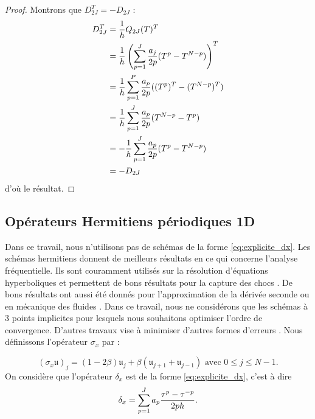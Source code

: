 \begin{proof}
Montrons que $D_{2J}^T = - D_{2J}$ :
\begin{align*}
D_{2J}^T & = \dfrac{1}{h} Q_{2J}(T)^T \\
	& = \dfrac{1}{h} \left( \displaystyle\sum\limits_{p=1}^J \dfrac{a_j}{2p} (T^p - T^{N-p}) \right)^T\\
	& = \dfrac{1}{h}\displaystyle\sum\limits_{p=1}^P \dfrac{a_p}{2p} ((T^p)^T - (T^{N-p})^T) \\
	& = \dfrac{1}{h}\displaystyle\sum\limits_{p=1}^J \dfrac{a_p}{2p} (T^{N-p} - T^{p}) \\
	& = - \dfrac{1}{h} \displaystyle\sum\limits_{p=1}^J \dfrac{a_p}{2p} (T^p - T^{N-p}) \\
	& = - D_{2J}
\end{align*}
d'où le résultat.
\end{proof}





























\subsection{Opérateurs Hermitiens périodiques 1D}

Dans ce travail, nous n'utilisons pas de schémas de la forme \eqref{eq:explicite_dx}. Les schémas hermitiens \cite{Lele1991} donnent de meilleurs résultats en ce qui concerne l'analyse fréquentielle. Ils sont couramment utilisés sur la résolution d'équations hyperboliques \cite{Chu1998} et permettent de bons résultats pour la capture des chocs \cite{Jiang2001}. De bons résultats ont aussi été donnés pour l'approximation de la dérivée seconde \cite{Abbas2011, Keller1971} ou en mécanique des fluides \cite{BenArtzi2005, BenArtzi2013}. Dans ce travail, nous ne considérons que les schémas à 3 points implicites pour lesquels nous souhaitons optimiser l'ordre de convergence. D'autres travaux vise à minimiser d'autres formes d'erreurs \cite{Kim1996, Kim2007}. Nous définissons l'opérateur $\sigma_{x}$ par :

\begin{equation}
(\sigma_{x} \mathfrak{u})_j = (1-2\beta) \mathfrak{u}_j + \beta \left( \mathfrak{u}_{j+1} + \mathfrak{u}_{j-1} \right) \text{ avec } 0 \leq j \leq N-1.
\end{equation}
On considère que l'opérateur $\delta_x$ est de la forme \eqref{eq:explicite_dx}, c'est à dire
\begin{equation}
\delta_x = \displaystyle\sum\limits_{p=1}^J a_p \dfrac{\tau^p - \tau^{-p}}{2ph}.
\end{equation}

